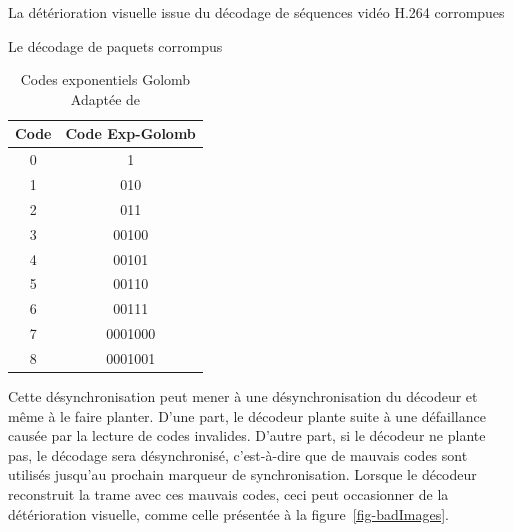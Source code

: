 \documentclass[letterpaper, twoside, 12pt,memoire]{thETS}
\newcommand{\fig}[1]{figure~\ref{#1}}
\begin{document}
\begin{chapter}{La détérioration visuelle issue du décodage de séquences vidéo
H.264 corrompues}
\begin{section}{Le décodage de paquets corrompus}
\begin{table}[!htb]
\caption{Codes exponentiels Golomb \\Adaptée de
\citet[p.~11]{Ikuno2007}}
\vspace{-1em}
\label{tab-ExpGolomb}
\centering
  \begin{tabular}{| c | c | }
    \hline
    Code & Code Exp-Golomb\\
    \hline
    0 & 1\\ \hline
    1 & 010\\ \hline
    2 & 011\\ \hline
    3 & 00100\\ \hline
    4 & 00101\\ \hline
    5 & 00110\\ \hline
    6 & 00111\\ \hline
    7 & 0001000\\ \hline
    8 & 0001001\\ \hline
  \end{tabular}
\end{table}

Cette désynchronisation peut mener à une désynchronisation du décodeur et même à le faire planter. D'une part, le décodeur plante suite à une défaillance causée
par la lecture de codes invalides. D'autre part, si le décodeur ne plante pas, le décodage sera
désynchronisé, c'est-à-dire que de mauvais codes sont utilisés jusqu'au prochain
marqueur de synchronisation. Lorsque le décodeur reconstruit la trame avec ces
mauvais codes, ceci peut occasionner de la détérioration visuelle, comme celle
présentée à la \fig{fig-badImages}.


\end{section}
\end{chapter}
\end{document}
